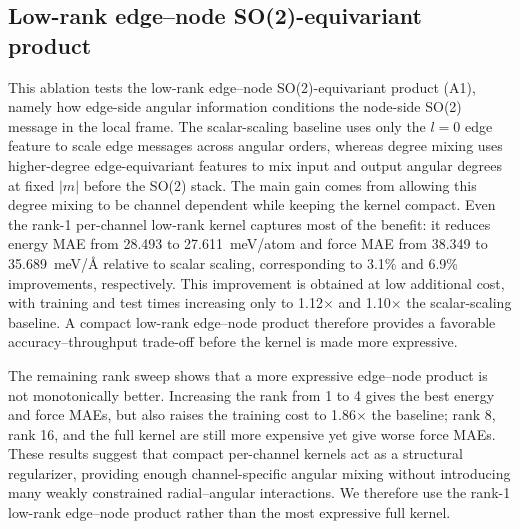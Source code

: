 \FloatBarrier
\subsection{Low-rank edge--node \texorpdfstring{SO(2)}{SO2}-equivariant product}
\label{sec:sm-radial-coupling}

This ablation tests the low-rank edge--node SO(2)-equivariant product (A1),
namely how edge-side angular information conditions the node-side SO(2) message
in the local frame. The scalar-scaling baseline uses only the $l=0$ edge feature
to scale edge messages across angular orders, whereas degree mixing uses
higher-degree edge-equivariant features to mix input and output angular degrees
at fixed $|m|$ before the SO(2) stack. The main gain comes from allowing this
degree mixing to be channel dependent while keeping the kernel compact. Even the
rank-1 per-channel low-rank kernel captures most of the benefit: it reduces
energy MAE from 28.493 to 27.611~meV/atom and force MAE from 38.349 to
35.689~meV/\AA{} relative to scalar scaling, corresponding to 3.1\% and 6.9\%
improvements, respectively. This improvement is obtained at low additional
cost, with training and test times increasing only to 1.12$\times$ and
1.10$\times$ the scalar-scaling baseline. A compact low-rank edge--node product
therefore provides a favorable accuracy--throughput trade-off before the
kernel is made more expressive.

The remaining rank sweep shows that a more expressive edge--node product is not
monotonically better. Increasing the rank from 1 to 4 gives the best energy and
force MAEs, but also raises the training cost to 1.86$\times$ the baseline;
rank 8, rank 16, and the full kernel are still more expensive yet give worse
force MAEs. These results suggest that compact per-channel kernels act as a
structural regularizer, providing enough channel-specific angular mixing
without introducing many weakly constrained radial--angular interactions. We
therefore use the rank-1 low-rank edge--node product rather than the most
expressive full kernel.

